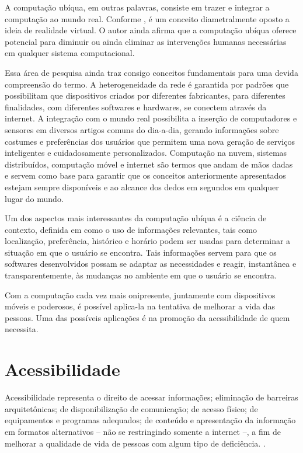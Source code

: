 \documentclass[english,brazilian]{UNISINOSmonografia}
\begin{document}
A computação ubíqua, em outras palavras, consiste em trazer e integrar a computação ao mundo real. Conforme , é um conceito diametralmente oposto a ideia de realidade virtual. O autor ainda afirma que a computação ubíqua oferece potencial para diminuir ou ainda eliminar as intervenções humanas necessárias em qualquer sistema computacional.

Essa área de pesquisa ainda traz consigo conceitos fundamentais para uma devida compreensão do termo. A heterogeneidade da rede é garantida por padrões que possibilitam que dispositivos criados por diferentes fabricantes, para diferentes finalidades, com diferentes softwares e hardwares, se conectem através da internet. A integração com o mundo real possibilita a inserção de computadores e sensores em diversos artigos comuns do dia-a-dia, gerando informações sobre costumes e preferências dos usuários que permitem uma nova geração de serviços inteligentes e cuidadosamente personalizados. Computação na nuvem, sistemas distribuídos, computação móvel e internet são termos que andam de mãos dadas e servem como base para garantir que os conceitos anteriormente apresentados estejam sempre disponíveis e ao alcance dos dedos em segundos em qualquer lugar do mundo.

Um dos aspectos mais interessantes da computação ubíqua é a ciência de contexto, definida em  como o uso de informações relevantes, tais como localização, preferência, histórico e horário podem ser usadas para determinar a situação em que o usuário se encontra. Tais informações servem para que os softwares desenvolvidos possam se adaptar as necessidades e reagir, instantânea e transparentemente, às mudanças no ambiente em que o usuário se encontra.

Com a computação cada vez mais onipresente, juntamente com dispositivos móveis e poderosos, é possível aplica-la na tentativa de melhorar a vida das pessoas. Uma das possíveis aplicações é na promoção da acessibilidade de quem necessita.

	\section{Acessibilidade}
Acessibilidade representa o direito de acessar informações; eliminação de barreiras arquitetônicas; de disponibilização de comunicação; de acesso físico; de equipamentos e programas adequados; de conteúdo e apresentação da informação em formatos alternativos – não se restringindo somente a internet –, a fim de melhorar a qualidade de vida de pessoas com algum tipo de deficiência. \cite{AcessibilidadeBrasil}. 
\end{document}
